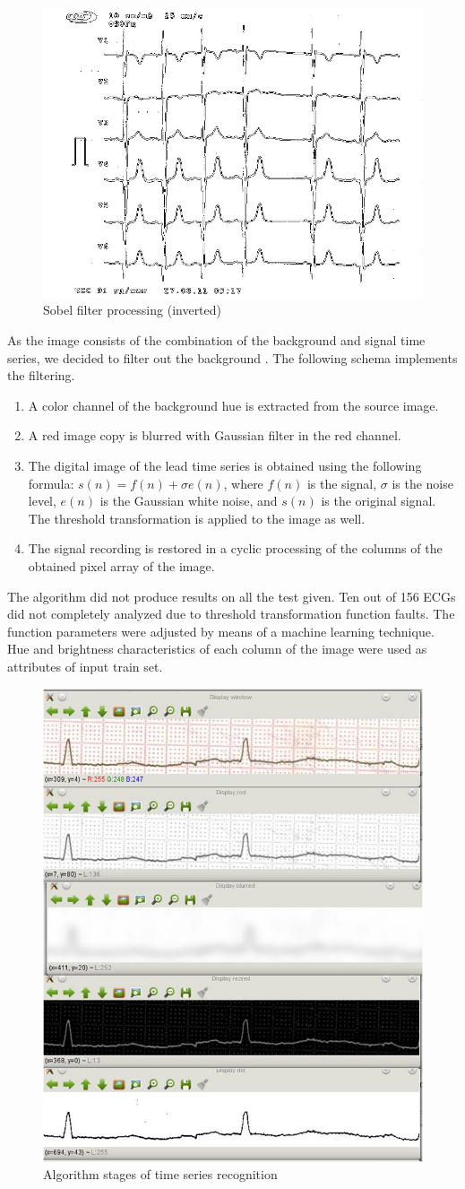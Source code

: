 \documentclass[runningheads]{AIIT}
\begin{document}
\begin{figure}[htb]
  \centering
    \includegraphics[width=0.5\linewidth] {images/Sobel.jpg}
  \caption{Sobel filter processing (inverted)}
  \label{fig:sobel-ex}
\end{figure}

As the image consists of the combination of the background and signal time series, we decided to filter out the background \cite{gonseles,1}.  The following schema implements the filtering.
\begin{enumerate}
\item A color channel of the background hue is extracted from the source image.
\item A red image copy is blurred with Gaussian filter in the red channel.
\item The digital image of the lead time series is obtained using the following formula:
  $s(n)=f(n)+\sigma e(n)$, where $f(n)$ is the signal, $\sigma$ is the
  noise level, $e(n)$ is the Gaussian white noise, and $s(n)$ is the original
  signal.  The threshold transformation is applied to the image as well.
\item The signal recording is restored in a cyclic processing of the columns of the obtained pixel array of the image.
\end{enumerate}
The algorithm did not produce results on all the test given.  Ten out of 156 ECGs did not completely analyzed due to threshold transformation function faults.  The function parameters were adjusted by means of a machine learning technique.  Hue and brightness characteristics of each column of the image were used as attributes of input train set.

\begin{figure}[htb]
  \centering
    \includegraphics[width=0.5\linewidth] {images/Algorithm.jpg}
  \caption{Algorithm stages of time series recognition}
  \label{fig:leads-ex}
\end{figure}
\end{document}
